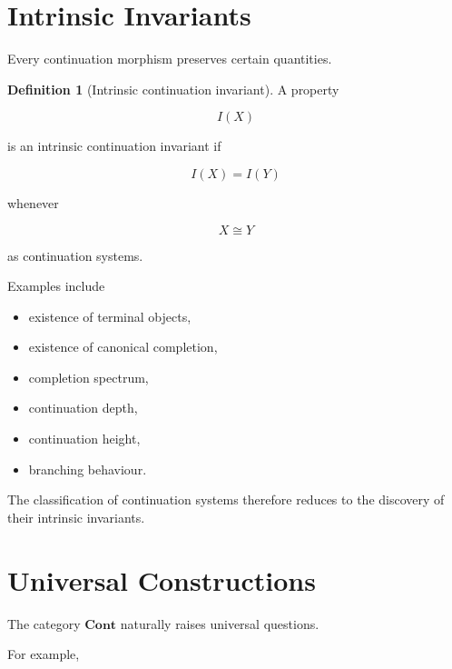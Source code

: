 \documentclass[13pt,openany]{book}
\theoremstyle{plain}
\theoremstyle{definition}
\newtheorem{definition}{Definition}[chapter]
\begin{document}
\section{Intrinsic Invariants}

Every continuation morphism preserves certain quantities.

\begin{definition}[Intrinsic continuation invariant]

A property

\[
I(X)
\]

is an intrinsic continuation invariant if

\[
I(X)=I(Y)
\]

whenever

\[
X
\cong
Y
\]

as continuation systems.

\end{definition}

Examples include

\begin{itemize}

\item existence of terminal objects,

\item existence of canonical completion,

\item completion spectrum,

\item continuation depth,

\item continuation height,

\item branching behaviour.

\end{itemize}

The classification of continuation systems therefore reduces to the discovery of
their intrinsic invariants.


\section{Universal Constructions}

The category $\mathbf{Cont}$ naturally raises universal questions.

For example,
\end{document}
